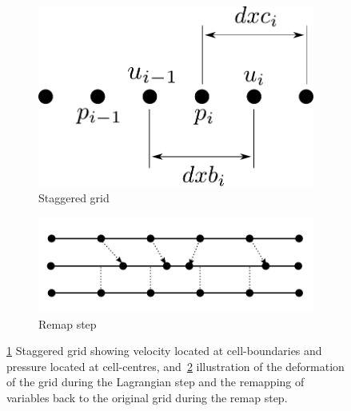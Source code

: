 \begin{figure}[t]
    \hfill
    \begin{subfigure}{0.3\textwidth}
      \centering
      \includegraphics[width=1.0\linewidth]{staggered_grid.pdf}
      \caption{Staggered grid}%
      \label{fig:staggered_grid}
    \end{subfigure}
    \hfill
    \begin{subfigure}{0.49\textwidth}
      \includegraphics[width=\linewidth]{remap.png}
      \caption{Remap step}%
      \label{fig:remap}
    \end{subfigure}
    \caption{\ref{fig:staggered_grid} Staggered grid showing velocity located at cell-boundaries and pressure located at cell-centres, and~\ref{fig:remap} illustration of the deformation of the grid during the Lagrangian step and the remapping of variables back to the original grid during the remap step.}
\label{fig:grid_and_remap}%
\end{figure}

